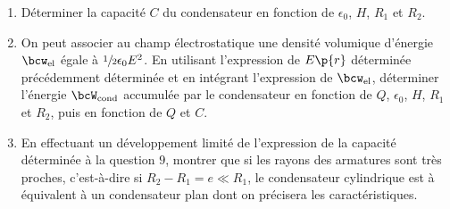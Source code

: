 \documentclass[a4paper,french,bookmarks]{article}
\begin{document}
\begin{enumerate}
        \item Déterminer la capacité $C$ du condensateur en fonction de $\epsilon_0$, $H$, $R_1$ et $R_2$.
        
        
        \item On peut associer au champ électrostatique une densité volumique d'énergie $\bcw_\text{el}$ égale à $\sfrac{1}{2}\epsilon_0 E^2$. En utilisant l'expression de $E\p{r}$ déterminée précédemment déterminée et en intégrant l'expression de $\bcw_\text{el}$, déterminer l'énergie $\bcW_\text{cond}$ accumulée par le condensateur en fonction de $Q$, $\epsilon_0$, $H$, $R_1$ et $R_2$, puis en fonction de $Q$ et $C$.
        
        \boxansconc{
            \[ \bcW_\text{cond} = \iiint \bcw_\text{el} = \dfrac{1}{2}\epsilon_0\int_{R_1}^{R_2} 2\pi r H E\p{r}^2\dif r = \dfrac{Q^2}{4\pi H}\int_{R_1}^{R_2} \dfrac{\dif r}{r} = \dfrac{Q^2}{4\pi \epsilon_0 H}\ln{\dfrac{R_2}{R_1}} = \dfrac{Q^2}{C}\]
        }
        
        \item En effectuant un développement limité de l'expression de la capacité déterminée à la question $9$, montrer que si les rayons des armatures sont très proches, c'est-à-dire si $R_2 - R_1 = e \ll R_1$, le condensateur cylindrique est à équivalent à un condensateur plan dont on précisera les caractéristiques.
        
        
        
        \noafter
        \nobefore\yesafter
        \yesbefore
    \end{enumerate}
    
    
\end{document}
